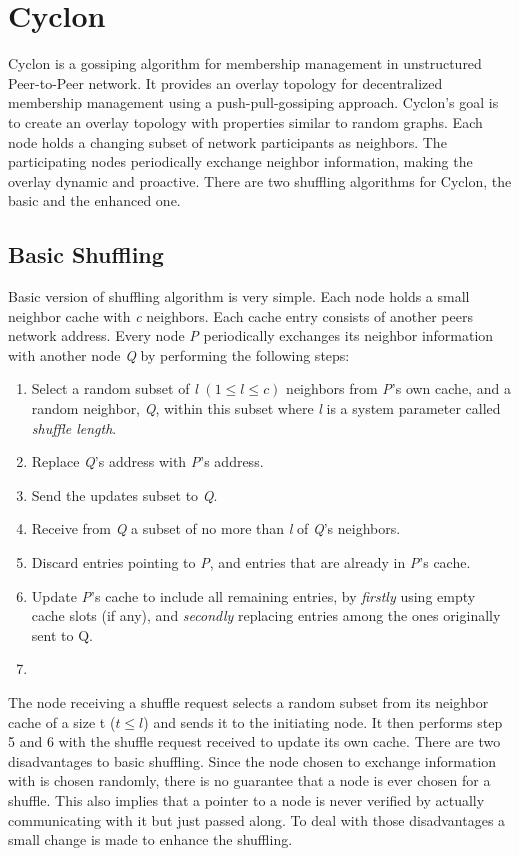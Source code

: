 \section{Cyclon} 
Cyclon is a gossiping algorithm for membership management in unstructured
Peer-to-Peer network. It provides an overlay topology for decentralized
membership management using a push-pull-gossiping approach. Cyclon's goal is to
create an overlay topology with properties similar to random graphs. Each node
holds a changing subset of network participants as neighbors. The
participating nodes periodically exchange neighbor information, making the
overlay dynamic and proactive.  There are two shuffling algorithms for Cyclon, the basic and the
enhanced one.
\subsection{Basic Shuffling}
Basic version of shuffling algorithm is very simple. Each node holds a small
neighbor cache with \emph{c} neighbors. Each cache entry consists of another
peers network address. Every node \emph{P} periodically exchanges its neighbor
information with another node \emph{Q} by performing the following steps:
\begin{enumerate}
\item Select a random subset of \emph{l} $(1 \leq l \leq c)$ neighbors from
\emph{P}'s own cache, and a random neighbor, \emph{Q}, within this subset where
\emph{l} is a system parameter called \emph{shuffle length}.
\item Replace \emph{Q}'s address with \emph{P}'s address.
\item Send the updates subset to \emph{Q}.
\item Receive from \emph{Q} a subset of no more than \emph{l} of \emph{Q}'s
neighbors.
\item Discard entries pointing to \emph{P}, and entries that are already in
\emph{P}'s cache.
\item Update \emph{P}'s cache to include all remaining entries, by
\emph{firstly} using empty cache slots (if any), and \emph{secondly} replacing
entries among the ones originally sent to Q.
\item \end{enumerate}
The node receiving a shuffle request selects a random subset from its neighbor
cache of a size t ($t \leq l$) and sends it to the initiating node. It then
performs step 5 and 6 with the shuffle request received to update its own cache.
There are two disadvantages to basic shuffling. Since the node chosen to
exchange information with is chosen randomly, there is no guarantee that a node
is ever chosen for a shuffle. This also implies that a pointer to a node is
never verified by actually communicating with it but just passed along. To deal
with those disadvantages a small change is made to enhance the shuffling.
 
